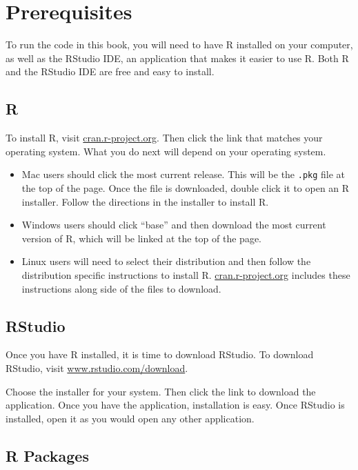 \section{Prerequisites}

To run the code in this book, you will need to have R installed on your
computer, as well as the RStudio IDE, an application that makes it
easier to use R. Both R and the RStudio IDE are free and easy to
install.

\subsection{R}

To install R, visit
\href{http://cran.r-project.org}{cran.r-project.org}. Then click the
link that matches your operating system. What you do next will depend on
your operating system.

\begin{itemize}
\item
  Mac users should click the most current release. This will be the
  \texttt{.pkg} file at the top of the page. Once the file is
  downloaded, double click it to open an R installer. Follow the
  directions in the installer to install R.
\item
  Windows users should click ``base'' and then download the most current
  version of R, which will be linked at the top of the page.
\item
  Linux users will need to select their distribution and then follow the
  distribution specific instructions to install R.
  \href{https://cran.r-project.org/bin/linux/}{cran.r-project.org}
  includes these instructions along side of the files to download.
\end{itemize}

\subsection{RStudio}

Once you have R installed, it is time to download RStudio. To download
RStudio, visit
\href{http://www.rstudio.com/download}{www.rstudio.com/download}.

Choose the installer for your system. Then click the link to download
the application. Once you have the application, installation is easy.
Once RStudio is installed, open it as you would open any other
application.

\subsection{R Packages}


